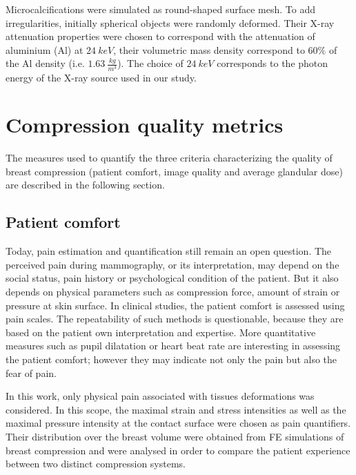 Microcalcifications were simulated as round-shaped surface mesh. To add irregularities, initially spherical objects were randomly deformed. Their X-ray attenuation properties were chosen to correspond with the attenuation of aluminium (Al) at $24 \ keV$, their volumetric mass density correspond to $60\%$ of the Al density (i.e. $1.63\ \frac{kg}{m^3}$).  The choice of $24\ keV$ corresponds to the photon energy of the X-ray source used in our study. 


\section{Compression quality metrics}\label{section:compressionqualitymetrics}

The measures used to quantify the three criteria characterizing the quality of breast compression (patient comfort, image quality and average glandular dose) are described in the following section.  

\subsection{Patient comfort}

Today, pain estimation and quantification still remain an open question. The perceived pain during mammography, or its interpretation, may depend on the social status, pain history or psychological condition of the patient. But it also depends on physical parameters such as compression force, amount of strain or pressure at skin surface. In clinical studies, the patient comfort is assessed using pain scales. The repeatability of such methods is questionable, because they are based on the patient own interpretation and expertise. More quantitative measures such as pupil dilatation or heart beat rate are interesting in assessing the patient comfort; however they may indicate not only the pain but also the fear of pain.        

In this work, only physical pain associated with tissues deformations was considered. In this scope, the maximal strain and stress intensities as well as the maximal pressure intensity at the contact surface were chosen as pain quantifiers. Their distribution over the breast volume were obtained from FE simulations of breast compression and were analysed in order to compare the patient experience between two distinct compression systems. 


